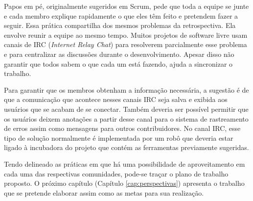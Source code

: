 Papos em pé, originalmente sugeridos em Scrum, pede que toda a equipe
se junte e cada membro explique rapidamente o que eles têm feito e
pretendem fazer a seguir. Essa prática compartilha dos mesmos
problemas da retrospectiva. Ela envolve reunir a equipe ao mesmo
tempo. Muitos projetos de software livre usam canais de IRC
(\emph{Internet Relay Chat}) para resolverem parcialmente esse
problema e para centralizar as discussões durante o
desenvolvimento. Apesar disso não garantir que todos sabem o que cada
um está fazendo, ajuda a sincronizar o trabalho.

Para garantir que os membros obtenham a informação necessária, a
sugestão é de que a comunicação que acontece nesses canais IRC seja
salva e exibida aos usuários que se acabam de se conectar. Também
deveria ser possível permitir que os usuários deixem anotações a
partir desse canal para o sistema de rastreamento de erros assim como
mensagens para outros contribuidores. No canal IRC, esse tipo de
solução normalmente é implementada por um robô que deveria estar
ligado à incubadora do projeto que contém as ferramentas previamente
sugeridas.

Tendo delineado as práticas em que há uma possibilidade de
aproveitamento em cada uma das respectivas comunidades, pode-se traçar
o plano de trabalho proposto. O próximo capítulo (Capítulo
\ref{cap:perspectivas}) apresenta o trabalho que se pretende elaborar
assim como as metas para sua realização.
